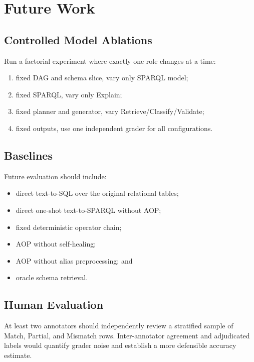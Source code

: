 \documentclass[11pt]{article}
\begin{document}
\section{Future Work}

\subsection{Controlled Model Ablations}

Run a factorial experiment where exactly one role changes at a time:

\begin{enumerate}[leftmargin=*]
    \item fixed DAG and schema slice, vary only SPARQL model;
    \item fixed SPARQL, vary only Explain;
    \item fixed planner and generator, vary Retrieve/Classify/Validate;
    \item fixed outputs, use one independent grader for all configurations.
\end{enumerate}

\subsection{Baselines}

Future evaluation should include:

\begin{itemize}[leftmargin=*]
    \item direct text-to-SQL over the original relational tables;
    \item direct one-shot text-to-SPARQL without AOP;
    \item fixed deterministic operator chain;
    \item AOP without self-healing;
    \item AOP without alias preprocessing; and
    \item oracle schema retrieval.
\end{itemize}

\subsection{Human Evaluation}

At least two annotators should independently review a stratified sample of Match, Partial, and Mismatch rows. Inter-annotator agreement and adjudicated labels would quantify grader noise and establish a more defensible accuracy estimate.
\end{document}
